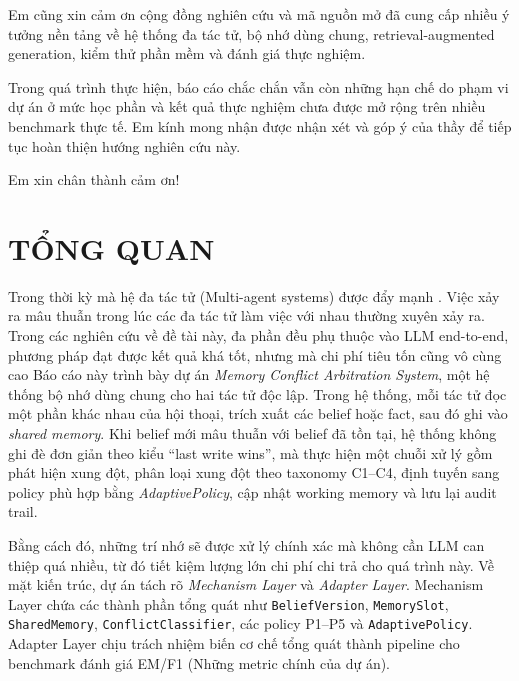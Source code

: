 \documentclass[12pt,a4paper]{article}
\begin{document}
Em cũng xin cảm ơn cộng đồng nghiên cứu và mã nguồn mở đã cung cấp nhiều ý tưởng nền tảng về hệ thống đa tác tử, bộ nhớ dùng chung, retrieval-augmented generation, kiểm thử phần mềm và đánh giá thực nghiệm.

Trong quá trình thực hiện, báo cáo chắc chắn vẫn còn những hạn chế do phạm vi dự án ở mức học phần và kết quả thực nghiệm chưa được mở rộng trên nhiều benchmark thực tế. Em kính mong nhận được nhận xét và góp ý của thầy để tiếp tục hoàn thiện hướng nghiên cứu này.

Em xin chân thành cảm ơn!

\newpage
\section*{TỔNG QUAN}
Trong thời kỳ mà hệ đa tác tử (Multi-agent systems) được đẩy mạnh \cite{park2023generative,yao2023react}. Việc xảy ra mâu thuẫn trong lúc các đa tác tử làm việc với nhau thường xuyên xảy ra. Trong các nghiên cứu về đề tài này, đa phần đều phụ thuộc vào LLM end-to-end, phương pháp đạt được kết quả khá tốt, nhưng mà chi phí tiêu tốn cũng vô cùng cao
Báo cáo này trình bày dự án \textit{Memory Conflict Arbitration System}, một hệ thống bộ nhớ dùng chung cho hai tác tử độc lập. Trong hệ thống, mỗi tác tử đọc một phần khác nhau của hội thoại, trích xuất các belief hoặc fact, sau đó ghi vào \textit{shared memory}. Khi belief mới mâu thuẫn với belief đã tồn tại, hệ thống không ghi đè đơn giản theo kiểu ``last write wins'', mà thực hiện một chuỗi xử lý gồm phát hiện xung đột, phân loại xung đột theo taxonomy C1--C4, định tuyến sang policy phù hợp bằng \textit{AdaptivePolicy}, cập nhật working memory và lưu lại audit trail.

Bằng cách đó, những trí nhớ sẽ được xử lý chính xác mà không cần LLM can thiệp quá nhiều, từ đó tiết kiệm lượng lớn chi phí chi trả cho quá trình này.
Về mặt kiến trúc, dự án tách rõ \textit{Mechanism Layer} và \textit{Adapter Layer}. Mechanism Layer chứa các thành phần tổng quát như \texttt{BeliefVersion}, \texttt{MemorySlot}, \texttt{SharedMemory}, \texttt{ConflictClassifier}, các policy P1--P5 và \texttt{AdaptivePolicy}. Adapter Layer chịu trách nhiệm biến cơ chế tổng quát thành pipeline cho benchmark đánh giá EM/F1 (Những metric chính của dự án).
\newpage
{}
\tableofcontents
\thispagestyle{empty}

\newpage
{}
\listoffigures
\thispagestyle{empty}

\newpage
{}
\listoftables
\thispagestyle{empty}
\end{document}
